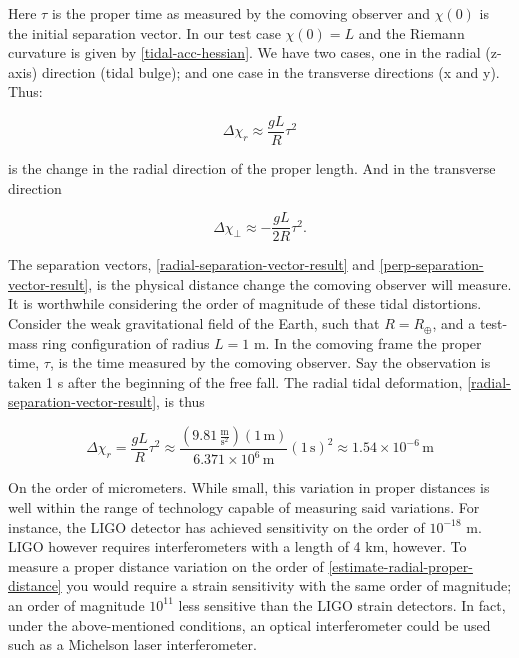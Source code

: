 \documentclass[11pt]{article}
\begin{document}
Here $\tau$ is the proper time as measured by the comoving observer and $\chi(0)$ is the initial separation vector. In our test case $\chi(0) = L$ and the Riemann curvature is given by \eqref{tidal-acc-hessian}. We have two cases, one in the radial (z-axis) direction (tidal bulge); and one case in the transverse directions (x and y). Thus:

\begin{equation}
    \label{radial-separation-vector-result}
    \Delta \chi_r \approx \frac{gL}{R} \tau^2
\end{equation}

is the change in the radial direction of the proper length. And in the transverse direction

\begin{equation}
    \label{perp-separation-vector-result}
    \Delta \chi_{\perp} \approx -\frac{gL}{2R} \tau^2.
\end{equation}

The separation vectors, \eqref{radial-separation-vector-result} and \eqref{perp-separation-vector-result}, is the physical distance change the comoving observer will measure. It is worthwhile considering the order of magnitude of these tidal distortions. Consider the weak gravitational field of the Earth, such that $R=R_{\oplus}$, and a test-mass ring configuration of radius $L = 1$ m. In the comoving frame the proper time, $\tau$, is the time measured by the comoving observer. Say the observation is taken 1 s after the beginning of the free fall. The radial tidal deformation, \eqref{radial-separation-vector-result}, is thus

\begin{equation}
    \label{estimate-radial-proper-distance}
    \Delta \chi_r = \frac{gL}{R} \tau^2 \approx \frac{(9.81\,\frac{\mathrm{m}}{\mathrm{s}^2}) (1\,\mathrm{m})}{6.371 \times 10^6\,\mathrm{m}} (1\,\mathrm{s})^2 \approx 1.54 \times 10^{-6}\,\mathrm{m}
\end{equation}

On the order of micrometers. While small, this variation in proper distances is well within the range of technology capable of measuring said variations. For instance, the LIGO detector has achieved sensitivity on the order of $10^{-18}$ m. LIGO however requires interferometers with a length of 4 km, however. To measure a proper distance variation on the order of \eqref{estimate-radial-proper-distance} you would require a strain sensitivity with the same order of magnitude; an order of magnitude $10^{11}$ less sensitive than the LIGO strain detectors. In fact, under the above-mentioned conditions, an optical interferometer could be used such as a Michelson laser interferometer.
\end{document}
